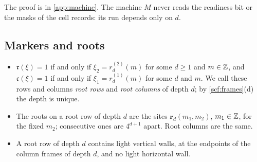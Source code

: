 The proof is in \cref{app:machine}. The machine $M$ never reads the readiness bit or the masks of the cell records: its run depends only on $d$.

\subsection{Markers and roots}

\begin{lemma}\label{bg:markers}
\begin{itemize}
\item[(a)] $\mathfrak r(\xi)=1$ if and only if $\xi_2=r^{(2)}_d(m)$ for some $d\ge1$ and $m\in\mathbb{Z}$, and $\mathfrak c(\xi)=1$ if and only if $\xi_1=r^{(1)}_d(m)$ for some $d$ and $m$. We call these rows and columns \emph{root rows} and \emph{root columns} of depth $d$; by \cref{scf:frames}(d) the depth is unique.
\item[(b)] The roots on a root row of depth $d$ are the sites $\mathbf r_d(m_1,m_2)$, $m_1\in\mathbb{Z}$, for the fixed $m_2$; consecutive ones are $4^{d+1}$ apart. Root columns are the same.
\item[(c)] A root row of depth $d$ contains light vertical walls, at the endpoints of the column frames of depth $d$, and no light horizontal wall.
\end{itemize}
\end{lemma}

